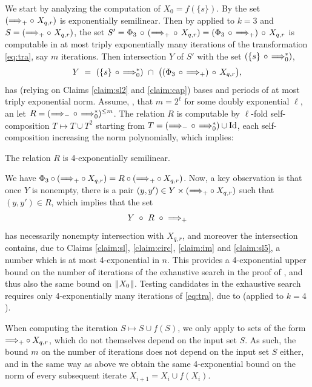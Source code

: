 We start by analyzing the computation of $X_0 = f(\{s\})$.
By  the set $(\Longrightarrow_{+} \circ \ X_{q,r})$
is exponentially semilinear.
Then by  
applied to $k=3$ and 
$S= (\Longrightarrow_{+} \circ \ X_{q,r})$, the set 
$S'=\Phi_3 \,\circ\, ({\Longrightarrow_{+}}\,\circ \,X_{q,r}) = 
(\Phi_3 \, \circ \, {\Longrightarrow_{+}})\,\circ \,X_{q,r}$
is computable in at most triply exponentially many iterations
of the transformation \eqref{eq:tra}, say $m$ iterations.
Then intersection $Y$ of $S'$
with the set $(\{s\} \, \circ \, {\Longrightarrow_{0}^*})$, 
\[
    Y \ = \ (\{s\} \, \circ \, {\stepp{0}^*}) \ \cap \ 
\bigl((\Phi_3 \, \circ \, {\stepp +})\, \circ \,X_{q,r}\bigr),
\]
has
(relying on Claims \ref{claim:sl2} and \ref{claim:cap})
bases and periods of at most triply exponential norm. 
Assume, \mywlog, that $m=2^\ell$ for some doubly exponential $\ell$, 
an let $R = ({\Longrightarrow_{-}} \, \circ \, {\Longrightarrow_{0}^*})^{\leq m}$.
The relation $R$ is computable by $\ell$-fold self-composition
$T\mapsto T \cup T^2$ starting from $T=({\Longrightarrow_{-}} \, \circ \, {\Longrightarrow_{0}^*}) \cup \text{Id}$,
each self-composition increasing the norm 
polynomially, which implies:
\begin{claim} \label{claim:sl5}
  The relation $R$ is 4-exponentially semilinear.
\end{claim}
% 
We have $\Phi_3 \circ ({\Longrightarrow_{+}}\circ X_{q,r}) =
R \circ ({\Longrightarrow_{+}}\circ X_{q,r})$.
Now, a key observation is that once $Y$ is nonempty,
there is a pair $(y,y')\in Y\times ({\Longrightarrow_{+}} \circ X_{q,r})$
such that
$ (y,y') \in R$,
which implies that the set
\[ Y \ \circ \ R \ \circ \ {\stepp +}
\]
has necessarily nonempty intersection with $X_{q,r}$, and moreover
the intersection contains, due to Claims \ref{claim:sl}, \ref{claim:circ}, 
\ref{claim:im} and \ref{claim:sl5}, 
a number
which is at most 4-exponential in $n$.
This provides a 4-exponential upper bound on the number of iterations 
of the exhaustive search 
in the proof of , and thus also the same
bound on $\lVert X_0\rVert$.
Testing candidates in the exhaustive search requires only
4-exponentially many iterations of \eqref{eq:tra}, due to
 (applied to $k=4$).

When computing the iteration $S \mapsto S \cup f(S)$,
we only apply \Cref{claim:sl4} to sets of the form
${\Longrightarrow_{+}} \circ X_{q,r}$, which do not themselves depend
on the input set $S$. As such,
the bound $m$ on the number of iterations does not depend
on the input set $S$ either,
and in the same way as above
we obtain the same 4-exponential bound on the norm of every
subsequent iterate $X_{i+1}=X_i \cup f(X_i)$.

